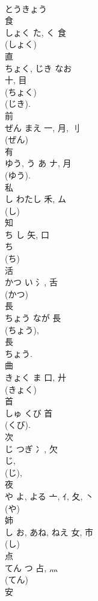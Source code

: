 \documentclass[8pt]{extreport}
\begin{document}
\begin{CJK}{UTF8}{min}
\\	とうきょう 
\\	食	
\\	しょく	た, く	食	
\\	(しょく) 
\\	直	
\\	ちょく, じき	なお	
\\	十, 目	
\\	(ちょく) 
\\	(じき). 
\\	前	
\\	ぜん	まえ	一, 月, 刂		
\\	(ぜん) 
\\	有	
\\	ゆう, う	あ	ナ, 月	
\\	(ゆう).	
\\	私	
\\	し	わたし	禾, ム	
\\	(し) 
\\	知	
\\	ち	し	矢, 口	
\\	ち 
\\	(ち) 
\\	活	
\\	かつ	い	氵, 舌	
\\	(かつ) 
\\	長	
\\	ちょう	なが	長	
\\	(ちょう), 
\\	長 
\\	ちょう.	
\\	曲	
\\	きょく	ま	口, 廾	
\\	(きょく) 
\\	首	
\\	しゅ	くび	首	
\\	(くび). 
\\	次	
\\	じ	つぎ	冫, 欠	
\\	じ, 
\\	(じ), 
\\	夜	
\\	や	よ, よる	亠, ｲ, 夂, 丶	
\\	(や) 
\\	姉	
\\	し	お, あね, ねえ	女, 市	
\\	(し) 
\\	点	
\\	てん	つ	占, 灬	
\\	(てん) 
\\	安	

\end{CJK}
\end{document}
